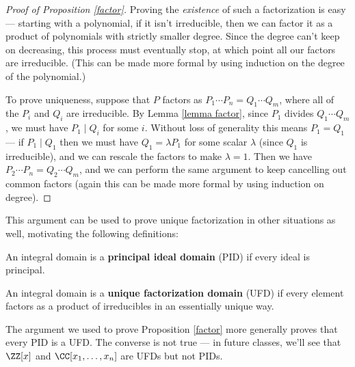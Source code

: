 \begin{proof}[Proof of Proposition \ref{factor}]
Proving the \emph{existence} of such a factorization is easy --- starting with a polynomial, if it isn't irreducible, then we can factor it as a product of polynomials with strictly smaller degree. Since the degree can't keep on decreasing, this process must eventually stop, at which point all our factors are irreducible. (This can be made more formal by using induction on the degree of the polynomial.)

To prove uniqueness, suppose that $P$ factors as $P_1\cdots P_n = Q_1\cdots Q_m$, where all of the $P_i$ and $Q_i$ are irreducible. By Lemma \ref{lemma factor}, since $P_1$ divides $Q_1\cdots Q_m$, we must have $P_1 \mid Q_i$ for some $i$. Without loss of generality this means $P_1 = Q_1$ --- if $P_1 \mid Q_1$ then we must have $Q_1 = \lambda P_1$ for some scalar $\lambda$ (since $Q_1$ is irreducible), and we can rescale the factors to make $\lambda = 1$. Then we have $P_2\cdots P_n = Q_2\cdots Q_m$, and we can perform the same argument to keep cancelling out common factors (again this can be made more formal by using induction on degree). 
\end{proof}


This argument can be used to prove unique factorization in other situations as well, motivating the following definitions:

\begin{definition}
An integral domain is a \textbf{principal ideal domain} (PID) if every ideal is principal. 
\end{definition}

\begin{definition}
An integral domain is a \textbf{unique factorization domain} (UFD) if every element factors as a product of irreducibles in an essentially unique way. 
\end{definition}

The argument we used to prove Proposition \ref{factor} more generally proves that every PID is a UFD. The converse is not true --- in future classes, we'll see that $\ZZ[x]$ and $\CC[x_1, \ldots, x_n]$ are UFDs but not PIDs. 


